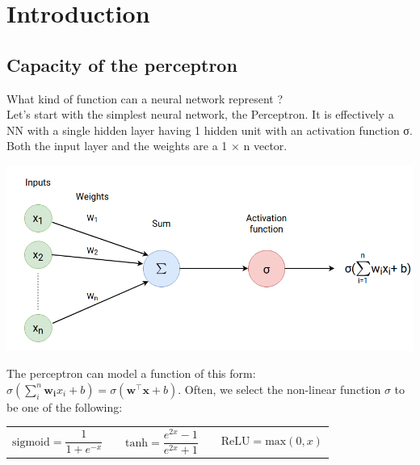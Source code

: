 \documentclass[12pt]{article}
\begin{document}
	\MakeScribeTop


\section{Introduction}

\subsection{Capacity of the perceptron}
What kind of function can a neural network represent ? \\
Let’s start with the simplest neural network, the Perceptron. It is effectively a NN with a single hidden layer having 1 hidden unit with an activation function σ. Both the input layer and the weights are a 1 × n vector.

\includegraphics[width=\textwidth]{figures/perceptron.png}

The perceptron can model a function of this form: $\sigma(\sum_i^{n} \mathbf{w_i} x_i +b) = \sigma(\mathbf{w}^\top \textbf{x} + b)$. Often, we select the non-linear function $\sigma$ to be one of the following:

\begin{subequations*}
  \begin{tabularx}{\textwidth}{}
  \begin{equation*}
     \text{sigmoid} = \frac{1}{1+e^{-x}}
  \end{equation*}
  & &
  \begin{equation*}
     \text{tanh} = \frac{e^{2x}-1}{e^{2x}+1}
  \end{equation*}
    & &
  \begin{equation*}
     \text{ReLU} = \text{max}(0, x)
  \end{equation*}
  \end{tabularx}
\end{subequations*}
\end{document}
